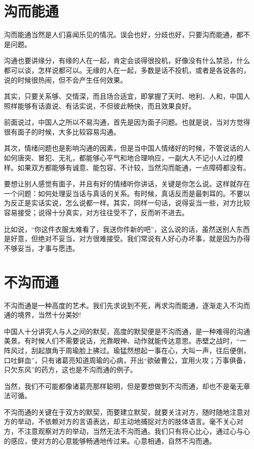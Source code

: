 \documentclass[fontset=fandol, a4paper, 12pt, openright]{ctexbook}
\begin{document}
\section{沟而能通}

沟而能通当然是人们喜闻乐见的情况。误会也好，分歧也好，只要沟而能通，都不是问题。

沟通也要讲缘分，有缘的人在一起，肯定会谈得很投机，好像没有什么禁忌，什么都可以谈，怎样说都可以。无缘的人在一起，多数是话不投机，或者是各说各的，说的时候很热闹，但不会产生任何效果。

其实，只要关系够、交情深，而且场合适宜，即掌握了天时、地利、人和，中国人照样能够有话直说、有话实说，不但彼此畅快，而且效果良好。

前面说过，中国人之所以不易沟通，首先是因为面子问题。也就是说，当对方觉得很有面子的时候，大多比较容易沟通。

其次，情绪问题也是影响沟通的因素，但是当中国人情绪好的时候，不管说话的人如何唐突、冒犯、无礼，都能够心平气和地合理响应，一副大人不记小人过的模样。如果双方都能够有诚意、能包容、不计较，当然沟而能通，一点障碍都没有。

要想让别人感觉有面子，并且有好的情绪听你讲话，关键是你怎么说。这样就存在一个问题：如何处理妥当话与真话的关系。有时候，真话反而是最刺耳的。不要以为反正是实话实说，怎么说都一样。其实，同样一句话，说得妥当一些，对方比较容易接受；说得十分真实，对方往往受不了，反而听不进去。

比如说，“你这件衣服太难看了，我送你件新的吧”，这么说的话，虽然送别人东西是好意，但绝对不妥当，对方很难接受。我们常说有人好心办坏事，就是因为办得不够妥当，才事与愿违。


\section{不沟而通}

不沟而通是一种高度的艺术。我们先求说到不死，再求沟而能通，逐渐走入不沟而通的境界，当然十分美妙!

中国人十分讲究人与人之间的默契，高度的默契便是不沟而通，是一种难得的沟通美景。有时候人们不需要说话，光靠眼神、动作就能传达意思。赤壁之战时，“一阵风过，刮起旗角于周瑜脸上拂过。瑜猛然想起一事在心，大叫一声，往后便倒，口吐鲜血”，只有诸葛亮知道周瑜的心病，开出“欲破曹公，宜用火攻；万事俱备，只欠东风”的药方，这也是不沟而通的例子。

当然，我们不可能都像诸葛亮那样聪明，但是要想做到不沟而通，却也不是毫无章法可循。

不沟而通的关键在于双方的默契，而要建立默契，就要关注对方，随时随地注意对方的举动，不依赖对方的言语表达，却主动地捕捉对方的肢体语言。毫不关心对方，不注意观察对方的举动，当然无法不沟而通。我们只有将心比心，通过心与心的感应，使对方的心意能够畅通地传过来。心意相通，自然不沟而通。
\end{document}
